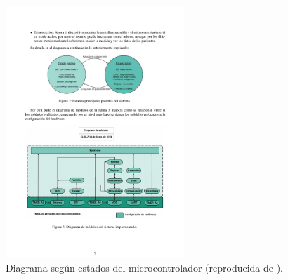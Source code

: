 \documentclass[a4paper,12pt]{article}
\begin{document}
\begin{linenumbers}
\begin{figure}[ht]
  \begin{center}
    \includegraphics[width=0.6\textwidth]{estados.pdf}
  \end{center}
  \caption{Diagrama según estados del microcontrolador (reproducida de \cite{cabrera2019}). }
  \label{fig:estados}
\end{figure}


\end{linenumbers}
\end{document}
